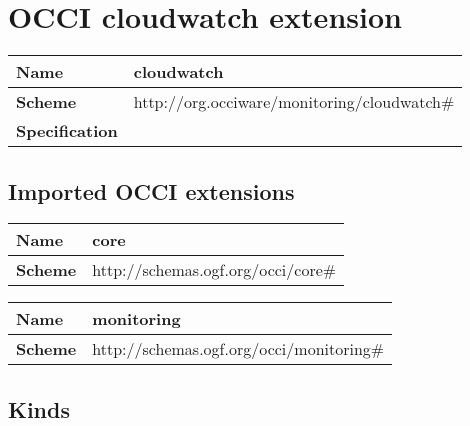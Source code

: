 \section{OCCI cloudwatch extension}
\begin{center}
\begin{tabular}{|l|l|}
  \hline
  \textbf{Name} & cloudwatch \\
  \hline  
  \textbf{Scheme} & http://org.occiware/monitoring/cloudwatch\# \\
  \hline
  \textbf{Specification} &  \\
  \hline
\end{tabular}
\end{center}

\subsection{Imported OCCI extensions}

\begin{center} 
\begin{tabular}{|l|l|}
  \hline
  \textbf{Name} & core \\
  \hline  
  \textbf{Scheme} & http://schemas.ogf.org/occi/core\# \\
  \hline
\end{tabular}
\end{center}
\begin{center} 
\begin{tabular}{|l|l|}
  \hline
  \textbf{Name} & monitoring \\
  \hline  
  \textbf{Scheme} & http://schemas.ogf.org/occi/monitoring\# \\
  \hline
\end{tabular}
\end{center}


\subsection{Kinds}
